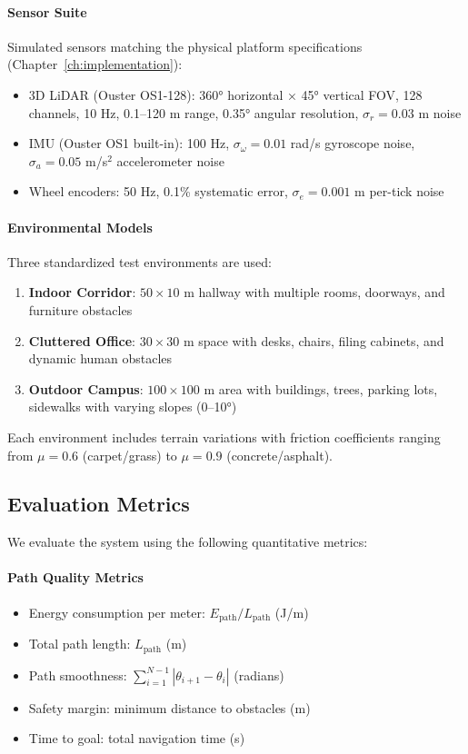 \paragraph{Sensor Suite}
Simulated sensors matching the physical platform specifications (Chapter~\ref{ch:implementation}):
\begin{itemize}
    \item 3D LiDAR (Ouster OS1-128): 360° horizontal × 45° vertical FOV, 128 channels, 10 Hz, 0.1--120 m range, 0.35° angular resolution, $\sigma_r = 0.03$ m noise
    \item IMU (Ouster OS1 built-in): 100 Hz, $\sigma_{\omega} = 0.01$ rad/s gyroscope noise, $\sigma_a = 0.05$ m/s$^2$ accelerometer noise
    \item Wheel encoders: 50 Hz, 0.1\% systematic error, $\sigma_e = 0.001$ m per-tick noise
\end{itemize}

\paragraph{Environmental Models}
Three standardized test environments are used:
\begin{enumerate}
    \item \textbf{Indoor Corridor}: $50 \times 10$ m hallway with multiple rooms, doorways, and furniture obstacles
    \item \textbf{Cluttered Office}: $30 \times 30$ m space with desks, chairs, filing cabinets, and dynamic human obstacles
    \item \textbf{Outdoor Campus}: $100 \times 100$ m area with buildings, trees, parking lots, sidewalks with varying slopes (0--10°)
\end{enumerate}

Each environment includes terrain variations with friction coefficients ranging from $\mu = 0.6$ (carpet/grass) to $\mu = 0.9$ (concrete/asphalt).

\subsection{Evaluation Metrics}

We evaluate the system using the following quantitative metrics:

\paragraph{Path Quality Metrics}
\begin{itemize}
    \item Energy consumption per meter: $E_{\text{path}} / L_{\text{path}}$ (J/m)
    \item Total path length: $L_{\text{path}}$ (m)
    \item Path smoothness: $\sum_{i=1}^{N-1} |\theta_{i+1} - \theta_i|$ (radians)
    \item Safety margin: minimum distance to obstacles (m)
    \item Time to goal: total navigation time (s)
\end{itemize}

